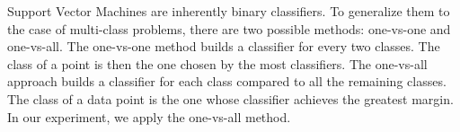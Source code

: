 Support Vector Machines are inherently binary classifiers. To generalize them to the case of multi-class problems, there are two possible methods: one-vs-one and one-vs-all. The one-vs-one method builds a classifier for every two classes. The class of a point is then the one chosen by the most classifiers. The one-vs-all approach builds a classifier for each class compared to all the remaining classes. The class of a data point is the one whose classifier achieves the greatest margin. In our experiment, we apply the one-vs-all method.